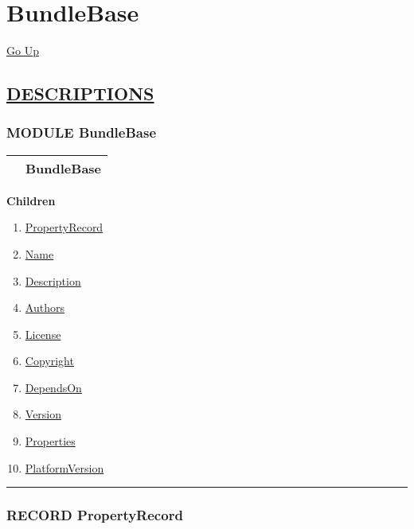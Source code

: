 \chapter*{\color{headfile}
BundleBase
}
\hypertarget{ecldoc:toc:BundleBase}{}
\hyperlink{ecldoc:toc:root}{Go Up}


\section*{\underline{\textsf{DESCRIPTIONS}}}
\subsection*{\textsf{\colorbox{headtoc}{\color{white} MODULE}
BundleBase}}

\hypertarget{ecldoc:BundleBase}{}

{\renewcommand{\arraystretch}{1.5}
\begin{tabularx}{\textwidth}{|>{\raggedright\arraybackslash}l|X|}
\hline
\hspace{0pt}\mytexttt{\color{red} } & \textbf{BundleBase} \\
\hline
\end{tabularx}
}

\par


\textbf{Children}
\begin{enumerate}
\item \hyperlink{ecldoc:bundlebase.propertyrecord}{PropertyRecord}
\item \hyperlink{ecldoc:bundlebase.name}{Name}
\item \hyperlink{ecldoc:bundlebase.description}{Description}
\item \hyperlink{ecldoc:bundlebase.authors}{Authors}
\item \hyperlink{ecldoc:bundlebase.license}{License}
\item \hyperlink{ecldoc:bundlebase.copyright}{Copyright}
\item \hyperlink{ecldoc:bundlebase.dependson}{DependsOn}
\item \hyperlink{ecldoc:bundlebase.version}{Version}
\item \hyperlink{ecldoc:bundlebase.properties}{Properties}
\item \hyperlink{ecldoc:bundlebase.platformversion}{PlatformVersion}
\end{enumerate}

\rule{\linewidth}{0.5pt}

\subsection*{\textsf{\colorbox{headtoc}{\color{white} RECORD}
PropertyRecord}}


